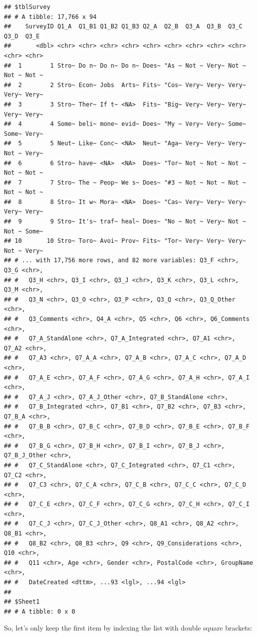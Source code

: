 \documentclass[
]{book}
\begin{document}
\begin{verbatim}
## $tblSurvey
## # A tibble: 17,766 x 94
##    SurveyID Q1_A  Q1_B1 Q1_B2 Q1_B3 Q2_A  Q2_B  Q3_A  Q3_B  Q3_C  Q3_D  Q3_E 
##       <dbl> <chr> <chr> <chr> <chr> <chr> <chr> <chr> <chr> <chr> <chr> <chr>
##  1        1 Stro~ Do n~ Do n~ Do n~ Does~ "As ~ Not ~ Very~ Not ~ Not ~ Not ~
##  2        2 Stro~ Econ~ Jobs  Arts~ Fits~ "Cos~ Very~ Very~ Very~ Very~ Very~
##  3        3 Stro~ Ther~ If t~ <NA>  Fits~ "Big~ Very~ Very~ Very~ Very~ Very~
##  4        4 Some~ beli~ mone~ evid~ Does~ "My ~ Very~ Very~ Some~ Some~ Very~
##  5        5 Neut~ Like~ Conc~ <NA>  Neut~ "Aga~ Very~ Very~ Very~ Not ~ Very~
##  6        6 Stro~ have~ <NA>  <NA>  Does~ "Tor~ Not ~ Not ~ Not ~ Not ~ Not ~
##  7        7 Stro~ The ~ Peop~ We s~ Does~ "#3 ~ Not ~ Not ~ Not ~ Not ~ Not ~
##  8        8 Stro~ It w~ Mora~ <NA>  Does~ "Cas~ Very~ Very~ Very~ Very~ Very~
##  9        9 Stro~ It's~ traf~ heal~ Does~ "No ~ Not ~ Very~ Not ~ Not ~ Some~
## 10       10 Stro~ Toro~ Avoi~ Prov~ Fits~ "Tor~ Very~ Very~ Very~ Not ~ Very~
## # ... with 17,756 more rows, and 82 more variables: Q3_F <chr>, Q3_G <chr>,
## #   Q3_H <chr>, Q3_I <chr>, Q3_J <chr>, Q3_K <chr>, Q3_L <chr>, Q3_M <chr>,
## #   Q3_N <chr>, Q3_O <chr>, Q3_P <chr>, Q3_Q <chr>, Q3_Q_Other <chr>,
## #   Q3_Comments <chr>, Q4_A <chr>, Q5 <chr>, Q6 <chr>, Q6_Comments <chr>,
## #   Q7_A_StandAlone <chr>, Q7_A_Integrated <chr>, Q7_A1 <chr>, Q7_A2 <chr>,
## #   Q7_A3 <chr>, Q7_A_A <chr>, Q7_A_B <chr>, Q7_A_C <chr>, Q7_A_D <chr>,
## #   Q7_A_E <chr>, Q7_A_F <chr>, Q7_A_G <chr>, Q7_A_H <chr>, Q7_A_I <chr>,
## #   Q7_A_J <chr>, Q7_A_J_Other <chr>, Q7_B_StandAlone <chr>,
## #   Q7_B_Integrated <chr>, Q7_B1 <chr>, Q7_B2 <chr>, Q7_B3 <chr>, Q7_B_A <chr>,
## #   Q7_B_B <chr>, Q7_B_C <chr>, Q7_B_D <chr>, Q7_B_E <chr>, Q7_B_F <chr>,
## #   Q7_B_G <chr>, Q7_B_H <chr>, Q7_B_I <chr>, Q7_B_J <chr>, Q7_B_J_Other <chr>,
## #   Q7_C_StandAlone <chr>, Q7_C_Integrated <chr>, Q7_C1 <chr>, Q7_C2 <chr>,
## #   Q7_C3 <chr>, Q7_C_A <chr>, Q7_C_B <chr>, Q7_C_C <chr>, Q7_C_D <chr>,
## #   Q7_C_E <chr>, Q7_C_F <chr>, Q7_C_G <chr>, Q7_C_H <chr>, Q7_C_I <chr>,
## #   Q7_C_J <chr>, Q7_C_J_Other <chr>, Q8_A1 <chr>, Q8_A2 <chr>, Q8_B1 <chr>,
## #   Q8_B2 <chr>, Q8_B3 <chr>, Q9 <chr>, Q9_Considerations <chr>, Q10 <chr>,
## #   Q11 <chr>, Age <chr>, Gender <chr>, PostalCode <chr>, GroupName <chr>,
## #   DateCreated <dttm>, ...93 <lgl>, ...94 <lgl>
## 
## $Sheet1
## # A tibble: 0 x 0
\end{verbatim}

So, let's only keep the first item by indexing the list with double square brackets:
\end{document}
